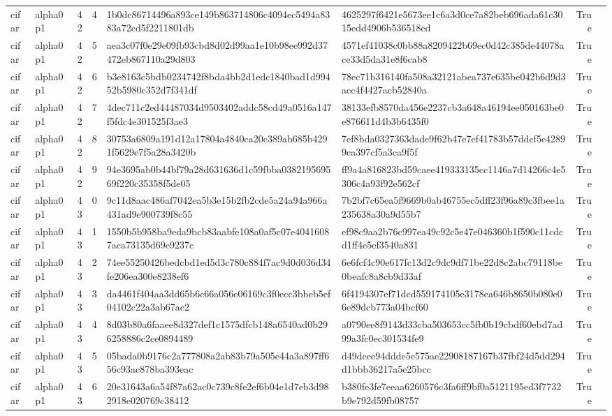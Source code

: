 \begin{tabular}{llrrllrl}
cifar & alpha0p1 & 42 & 4 & 1b0dc86714496a893ce149b863714806c4094ec5494a8383a72cd5f2211801db & 4625297f6421e5673ee1c6a3d0ce7a82beb696ada61c3015edd4906b536518ed & True &  \\
cifar & alpha0p1 & 42 & 5 & aea3c07f0e29e09fb93cbd8d02d99aa1e10b98ee992d37472eb867110a29d803 & 4571ef41038c0bb88a8209422b69ec0d42c385de44078ace33d5da31e8f6cab8 & True &  \\
cifar & alpha0p1 & 42 & 6 & b3e8163c5bdb0234742f8bda4bb2d1edc1840bad1d99452b5980c352d7f341df & 78ec71b316140fa508a32121abea737e635be042b6d9d3acc4f4427acb52840a & True &  \\
cifar & alpha0p1 & 42 & 7 & 4dec711c2ed44487034d9503402addc58cd49a0516a147f5fdc4e301525f3ae3 & 38133efb8570da456e2237cb3a648a46194ee050163be0e876611d4b3b6435f0 & True &  \\
cifar & alpha0p1 & 42 & 8 & 30753a6809a191d12a17804a4840ca20c389ab685b4291f5629e7f5a28a3420b & 7ef8bda0327363dade9f62b47e7ef41783b57ddcf5c42899ca397cf5a3ca9f5f & True &  \\
cifar & alpha0p1 & 42 & 9 & 94e3695ab0b44bf79a28d631636d1c59fbba038219569569f220c35358f5de05 & ff9a4a816823bd59caee419333135cc1146a7d14266c4e5306c4a93f92e562cf & True &  \\
cifar & alpha0p1 & 43 & 0 & 9c11d8aac486af7042ea5b3e15b2fb2cde5a24a94a966a431ad9e900739f8c55 & 7b2bf7c65ea5f9669b0ab46755ec5dff23f96a89c3fbee1a235638a30a9d55b7 & True &  \\
cifar & alpha0p1 & 43 & 1 & 1550b5b958ba9eda9bcb83aabfe108a0af5c07e40416087aca73135d69e9237c & ef98c9aa2b76c997ea49c92c5e47e046360b1f590c11cdcd1ff4e5ef3540a831 & True &  \\
cifar & alpha0p1 & 43 & 2 & 74ee55250426bedcbd1ed5d3c780c884f7ac9d0d036d34fe206ea300e8238ef6 & 6e6fcf4c90e617fc13d2c9dc9df71be22d8c2abc79118be0beafc8a8cb9d33af & True &  \\
cifar & alpha0p1 & 43 & 3 & da4461f404aa3dd65b6c66a056e06169c3f0ecc3bbeb5ef04102c22a3ab67ac2 & 6f4194307ef71dcd559174105e3178ea646b8650b080e06e89dcb773a04bcf60 & True &  \\
cifar & alpha0p1 & 43 & 4 & 8d03b80a6faaee8d327def1c1575dfcb148a6540ad0b296258886c2ce0894489 & a0790ee8f9143d33cba503653cc5fb0b19cbdf60ebd7ad99a3fc0ec301534fe9 & True &  \\
cifar & alpha0p1 & 43 & 5 & 05bada0b9176c2a777808a2ab83b79a505e44a3a897ff656c93ac878ba393eac & d49deee94ddde5e575ae22908187167b37fbf24d5dd294d1bbb36217a5e25bcc & True &  \\
cifar & alpha0p1 & 43 & 6 & 20e31643a6a54f87a62ac0c739c8fe2ef6b04e1d7eb3d982918e020769c38412 & b380fe3fe7eeaa6260576c3fa6ff9bf0a5121195ed3f7732b9e792d59fb08757 & True &  \\

\end{tabular}
